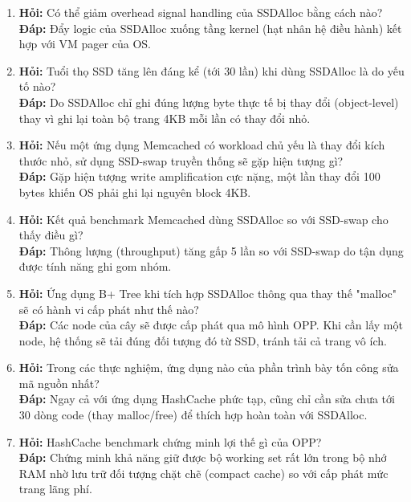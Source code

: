 \documentclass[12pt,a4paper]{article}
\begin{document}
\begin{enumerate}
    \item \textbf{Hỏi:} Có thể giảm overhead signal handling của SSDAlloc bằng cách nào? \\
    \textbf{Đáp:} Đẩy logic của SSDAlloc xuống tầng kernel (hạt nhân hệ điều hành) kết hợp với VM pager của OS.
    
    \item \textbf{Hỏi:} Tuổi thọ SSD tăng lên đáng kể (tới 30 lần) khi dùng SSDAlloc là do yếu tố nào? \\
    \textbf{Đáp:} Do SSDAlloc chỉ ghi đúng lượng byte thực tế bị thay đổi (object-level) thay vì ghi lại toàn bộ trang 4KB mỗi lần có thay đổi nhỏ.
    
    \item \textbf{Hỏi:} Nếu một ứng dụng Memcached có workload chủ yếu là thay đổi kích thước nhỏ, sử dụng SSD-swap truyền thống sẽ gặp hiện tượng gì? \\
    \textbf{Đáp:} Gặp hiện tượng write amplification cực nặng, một lần thay đổi 100 bytes khiến OS phải ghi lại nguyên block 4KB.
    
    \item \textbf{Hỏi:} Kết quả benchmark Memcached dùng SSDAlloc so với SSD-swap cho thấy điều gì? \\
    \textbf{Đáp:} Thông lượng (throughput) tăng gấp 5 lần so với SSD-swap do tận dụng được tính năng ghi gom nhóm.
    
    \item \textbf{Hỏi:} Ứng dụng B+ Tree khi tích hợp SSDAlloc thông qua thay thế "malloc" sẽ có hành vi cấp phát như thế nào? \\
    \textbf{Đáp:} Các node của cây sẽ được cấp phát qua mô hình OPP. Khi cần lấy một node, hệ thống sẽ tải đúng đối tượng đó từ SSD, tránh tải cả trang vô ích.
    
    \item \textbf{Hỏi:} Trong các thực nghiệm, ứng dụng nào của phần trình bày tốn công sửa mã nguồn nhất? \\
    \textbf{Đáp:} Ngay cả với ứng dụng HashCache phức tạp, cũng chỉ cần sửa chưa tới 30 dòng code (thay malloc/free) để thích hợp hoàn toàn với SSDAlloc.
    
    \item \textbf{Hỏi:} HashCache benchmark chứng minh lợi thế gì của OPP? \\
    \textbf{Đáp:} Chứng minh khả năng giữ được bộ working set rất lớn trong bộ nhớ RAM nhờ lưu trữ đối tượng chặt chẽ (compact cache) so với cấp phát mức trang lãng phí.
    

\end{enumerate}
\end{document}
